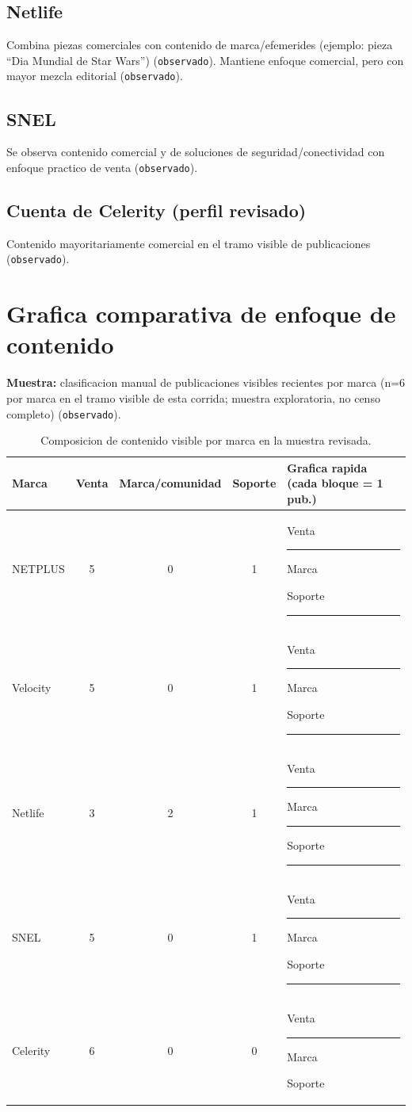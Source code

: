 \documentclass[9pt,a4paper,twocolumn,twoside]{tau-class/tau}
\begin{document}
\subsection{Netlife}
Combina piezas comerciales con contenido de marca/efemerides (ejemplo: pieza ``Dia Mundial de Star Wars'') (\texttt{observado}). Mantiene enfoque comercial, pero con mayor mezcla editorial (\texttt{observado}).

\subsection{SNEL}
Se observa contenido comercial y de soluciones de seguridad/conectividad con enfoque practico de venta (\texttt{observado}).

\subsection{Cuenta de Celerity (perfil revisado)}
Contenido mayoritariamente comercial en el tramo visible de publicaciones (\texttt{observado}).

\section{Grafica comparativa de enfoque de contenido}
\textbf{Muestra:} clasificacion manual de publicaciones visibles recientes por marca (n=6 por marca en el tramo visible de esta corrida; muestra exploratoria, no censo completo) (\texttt{observado}).

\begin{table}[t]
  \centering
  \small
  \begin{tabular}{@{}lccc p{4.8cm}@{}}
    \toprule
    \textbf{Marca} & \textbf{Venta} & \textbf{Marca/comunidad} & \textbf{Soporte} & \textbf{Grafica rapida (cada bloque = 1 pub.)} \\
    \midrule
    NETPLUS & 5 & 0 & 1 & Venta \rule{2.1cm}{1.6mm} Marca \rule{0.0cm}{1.6mm} Soporte \rule{0.5cm}{1.6mm} \\
    Velocity & 5 & 0 & 1 & Venta \rule{2.1cm}{1.6mm} Marca \rule{0.0cm}{1.6mm} Soporte \rule{0.5cm}{1.6mm} \\
    Netlife & 3 & 2 & 1 & Venta \rule{1.2cm}{1.6mm} Marca \rule{0.8cm}{1.6mm} Soporte \rule{0.5cm}{1.6mm} \\
    SNEL & 5 & 0 & 1 & Venta \rule{2.1cm}{1.6mm} Marca \rule{0.0cm}{1.6mm} Soporte \rule{0.5cm}{1.6mm} \\
    Celerity & 6 & 0 & 0 & Venta \rule{2.5cm}{1.6mm} Marca \rule{0.0cm}{1.6mm} Soporte \rule{0.0cm}{1.6mm} \\
    \bottomrule
  \end{tabular}
  \caption{Composicion de contenido visible por marca en la muestra revisada.}
\end{table}
\end{document}
